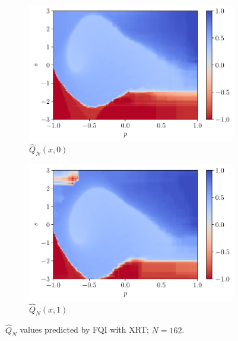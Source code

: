 \documentclass[a4paper, 12pt]{article}
\begin{document}
    \begin{figure}[h]
        \centering
        \begin{subfigure}{0.49\textwidth}
            \centering
            \includegraphics[width=\textwidth]{resources/pdf/previous_montecarlo_1_XRT_q0.pdf}
            \caption{$\hat{Q}_N(x, 0)$}
        \end{subfigure}
        \hfill
        \begin{subfigure}{0.49\textwidth}
            \centering
            \includegraphics[width=\textwidth]{resources/pdf/previous_montecarlo_1_XRT_q1.pdf}
            \caption{$\hat{Q}_N(x, 1)$}
        \end{subfigure}
        \caption{$\hat{Q}_N$ values predicted by FQI with XRT; $N = 162$.}
        \label{fig:fqi.xrt}
    \end{figure}
    
\end{document}
